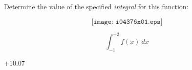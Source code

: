 

Determine the value of the specified {\it integral} for this function:

$$\texttt{[image: i04376x01.eps]}$$

$$\int_{-1}^{+2} f(x) \> dx$$







+10.07











